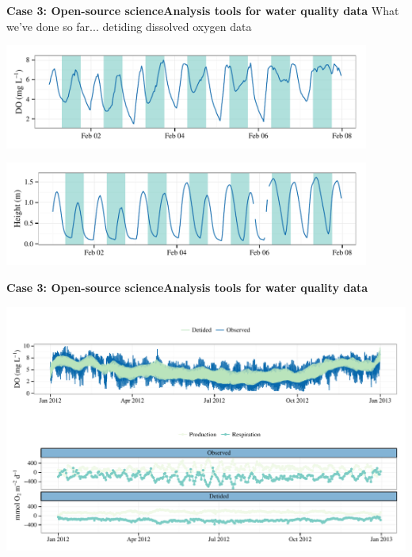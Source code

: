 \documentclass[serif]{beamer}\usepackage[]{graphicx}\usepackage[]{color}
\newenvironment{knitrout}{}{} %
\begin{document}
\begin{frame}{\textbf{Case 3: Open-source science}}{\textbf{Analysis tools for water quality data}}
\onslide<+->
What we've done so far... detiding dissolved oxygen data


{\centering \includegraphics[width=0.9\textwidth]{fig/sapdo-1} 

}



\onslide<+->


{\centering \includegraphics[width=0.9\textwidth]{fig/saptide-1} 

}



\end{frame}

\begin{frame}{\textbf{Case 3: Open-source science}}{\textbf{Analysis tools for water quality data}}
\vspace{-0.1in}
\begin{knitrout}
\color{fgcolor}

{\centering \includegraphics[width=\textwidth]{fig/dtd_met-1} 

}



\end{knitrout}
\end{frame}
\end{document}
